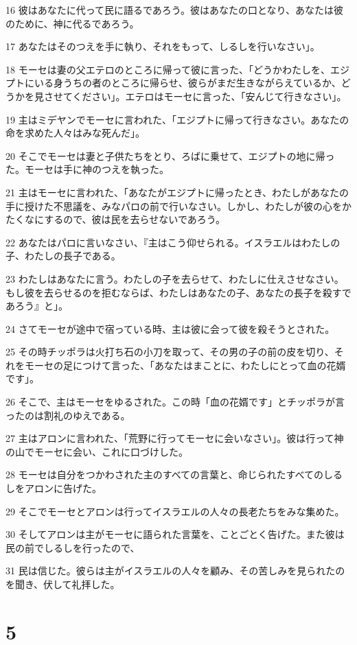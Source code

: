 \par 16 彼はあなたに代って民に語るであろう。彼はあなたの口となり、あなたは彼のために、神に代るであろう。
\par 17 あなたはそのつえを手に執り、それをもって、しるしを行いなさい」。
\par 18 モーセは妻の父エテロのところに帰って彼に言った、「どうかわたしを、エジプトにいる身うちの者のところに帰らせ、彼らがまだ生きながらえているか、どうかを見させてください」。エテロはモーセに言った、「安んじて行きなさい」。
\par 19 主はミデヤンでモーセに言われた、「エジプトに帰って行きなさい。あなたの命を求めた人々はみな死んだ」。
\par 20 そこでモーセは妻と子供たちをとり、ろばに乗せて、エジプトの地に帰った。モーセは手に神のつえを執った。
\par 21 主はモーセに言われた、「あなたがエジプトに帰ったとき、わたしがあなたの手に授けた不思議を、みなパロの前で行いなさい。しかし、わたしが彼の心をかたくなにするので、彼は民を去らせないであろう。
\par 22 あなたはパロに言いなさい、『主はこう仰せられる。イスラエルはわたしの子、わたしの長子である。
\par 23 わたしはあなたに言う。わたしの子を去らせて、わたしに仕えさせなさい。もし彼を去らせるのを拒むならば、わたしはあなたの子、あなたの長子を殺すであろう』と」。
\par 24 さてモーセが途中で宿っている時、主は彼に会って彼を殺そうとされた。
\par 25 その時チッポラは火打ち石の小刀を取って、その男の子の前の皮を切り、それをモーセの足につけて言った、「あなたはまことに、わたしにとって血の花婿です」。
\par 26 そこで、主はモーセをゆるされた。この時「血の花婿です」とチッポラが言ったのは割礼のゆえである。
\par 27 主はアロンに言われた、「荒野に行ってモーセに会いなさい」。彼は行って神の山でモーセに会い、これに口づけした。
\par 28 モーセは自分をつかわされた主のすべての言葉と、命じられたすべてのしるしをアロンに告げた。
\par 29 そこでモーセとアロンは行ってイスラエルの人々の長老たちをみな集めた。
\par 30 そしてアロンは主がモーセに語られた言葉を、ことごとく告げた。また彼は民の前でしるしを行ったので、
\par 31 民は信じた。彼らは主がイスラエルの人々を顧み、その苦しみを見られたのを聞き、伏して礼拝した。

\chapter{5}

